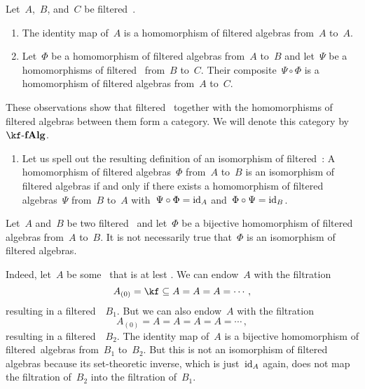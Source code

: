 \begin{remark}
	Let~$A$,~$B$, and~$C$ be filtered~\algebras{$\kf$}.
	\begin{enumerate}
		\item
			The identity map of~$A$ is a homomorphism of filtered algebras from~$A$ to~$A$.
		\item
			Let~$\Phi$ be a homomorphism of filtered algebras from~$A$ to~$B$ and let~$\Psi$ be a homomorphisms of filtered~\algebras{$\kf$} from~$B$ to~$C$.
			Their composite~$\Psi \circ \Phi$ is a homomorphism of filtered algebras from~$A$ to~$C$.
	\end{enumerate}
	These observations show that filtered~\algebras{$\kf$} together with the homomorphisms of filtered algebras between them form a category.
	We will denote this category by~$\cfAlg{\kf}$.
	\begin{enumerate}[resume*]
		\item
			Let us spell out the resulting definition of an isomorphism of filtered~\algebras{$\kf$}:
			A homomorphism of filtered algebras~$\Phi$ from~$A$ to~$B$ is an isomorphism of filtered algebras if and only if there exists a homomorphism of filtered algebras~$\Psi$ from~$B$ to~$A$ with~$\Psi \circ \Phi = \mathrm{id}_A$ and~$\Phi \circ \Psi = \mathrm{id}_B$.
	\end{enumerate}
\end{remark}


\begin{warning}
	Let~$A$ and~$B$ be two filtered~\algebras{$\kf$} and let~$\Phi$ be a bijective homomorphism of filtered algebras from~$A$ to~$B$.
	It is not necessarily true that~$\Phi$ is an isomorphism of filtered algebras.
	
	Indeed, let~$A$ be some~\algebra{$\kf$} that is at lest {\twodimensional}.
	We can endow~$A$ with the filtration
	\[
		A_{(0)}
		=
		\kf
		\subseteq
		A
		=
		A
		=
		A
		=
		\dotsb \,,
	\]
	resulting in a filtered~\algebra{$\kf$}~$B_1$.
	But we can also endow~$A$ with the filtration
	\[
		A_{(0)}
		=
		A
		=
		A
		=
		A
		=
		A
		=
		\dotsb \,,
	\]
	resulting in a filtered~\algebra{$\kf$}~$B_2$.
	The identity map of~$A$ is a bijective homomorphism of filtered~algebras from~$B_1$ to~$B_2$.
	But this is not an isomorphism of filtered algebras because its set-theoretic inverse, which is just~$\mathrm{id}_A$ again, does not map the filtration of~$B_2$ into the filtration of~$B_1$.
\end{warning}



